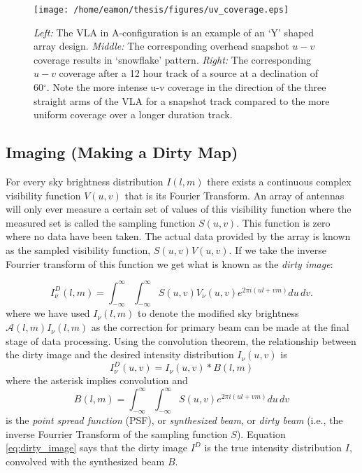 \begin{figure}[hbt!]
\centering 
          \texttt{[image: /home/eamon/thesis/figures/uv\_coverage.eps]}
\caption[VLA antenna layout and two examples of $u-v$ coverage for different track lengths.]{\textit{Left:} The VLA in A-configuration is an example of an `Y' shaped array design. \textit{Middle:} The corresponding overhead snapshot $u-v$ coverage results in `snowflake' pattern. \textit{Right:} The corresponding $u-v$ coverage after a 12 hour track of a source at a declination of 60$^{\circ}$. Note the more intense u-v coverage in the direction of the three straight arms of the VLA for a snapshot track compared to the more uniform coverage over a longer duration track.}
\label{fig2.9}
\end{figure}

\subsection{Imaging (Making a Dirty Map)}\label{subsec:4.2}
For every sky brightness distribution $I(l,m)$ there exists a continuous complex visibility function $V(u,v)$ that is its Fourier Transform. An array of antennas will only ever measure a certain set of values of this visibility function where the measured set is called the sampling function $S(u,v)$. This function is zero where no data have been taken. The actual data provided by the array is known as the sampled visibility function, $S(u,v)V(u,v)$. If we take the inverse Fourrier transform of this function we get what is known as the \textit{dirty image}:

\begin{equation}\label{eq:dirtyim}
I_{\nu}^{D}(l,m)=\int ^{\infty}_{-\infty}\int ^{\infty}_{-\infty}S(u,v)V_{\nu}(u,v)\mathit{e}^{2\pi \mathit{i}(ul+vm)}du\,dv.
\end{equation}
where we have used $I_{\nu}(l,m)$ to denote the modified sky brightness $\mathcal{A}(l,m)I_{\nu}(l,m)$ as the correction for primary beam can be made at the final stage of data processing. Using the convolution theorem, the relationship between the dirty image and the desired intensity distribution $I_{\nu}(u,v)$ is
\begin{equation}\label{eq:dirty_image}
I_{\nu}^{D}(u,v)=I_{\nu}(u,v)*B(l,m)
\end{equation}
where the asterisk implies convolution and
\begin{equation}\label{beam_samp}
B(l,m) = \int ^{\infty}_{-\infty}\int ^{\infty}_{-\infty}S(u,v)\mathit{e}^{2\pi \mathit{i}(ul+vm)}du\,dv
\end{equation}
is the \textit{point spread function} (PSF), or \textit{synthesized beam}, or \textit{dirty beam} (i.e., the inverse Fourrier Transform of the sampling function $S$). Equation \ref{eq:dirty_image} says that the dirty image $I^{D}$ is the true intensity distribution $I$, convolved with the synthesized beam $B$.

